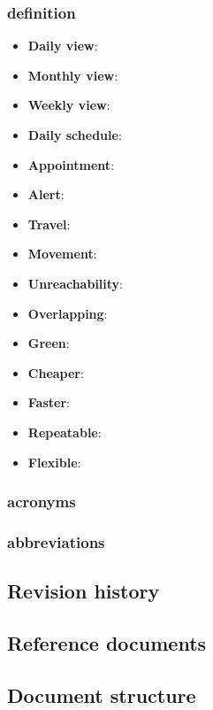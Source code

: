 \subsubsection{definition}
\begin{itemize}
	\item \textbf{Daily view}:  
	\item \textbf{Monthly view}:
	\item \textbf{Weekly view}:
	\item \textbf{Daily schedule}:
	\item \textbf{Appointment}: 
	\item \textbf{Alert}:
	\item \textbf{Travel}:
	\item \textbf{Movement}:
	\item \textbf{Unreachability}:
	\item \textbf{Overlapping}:
	\item \textbf{Green}:
	\item \textbf{Cheaper}:
	\item \textbf{Faster}:
	\item \textbf{Repeatable}:
	\item \textbf{Flexible}:
\end{itemize}
\subsubsection{acronyms}
\subsubsection{abbreviations}

\subsection{Revision history}
\subsection{Reference documents}
\subsection{Document structure}

